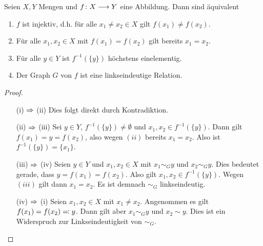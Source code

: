 \begin{bem}


  Seien $X, Y$ Mengen und $f\colon X \longrightarrow Y$ eine Abbildung. Dann sind
  äquivalent
  \begin{enumerate}

    \item $f$ ist injektiv, d.h. für alle $x_{1}\neq x_{2} \in X$ gilt
      $f(x_{1})\neq f(x_{2})$.

    \item Für alle $x_{1},x_{2}\in X$ mit $f(x_{1})=f(x_{2})$ gilt
      bereits $x_{1}=x_{2}$.

    \item Für alle $y\in Y$ ist $f^{-1}(\{ y \})$ höchstens
      einelementig.

    \item Der Graph $G$ von $f$ ist eine linkseindeutige Relation.

  \end{enumerate}

  \begin{proof}
    \quad

    \begin{itemize}
    \item[\tiny{(i) $\Rightarrow$ (ii)}] 
      Dies folgt direkt durch Kontradiktion.

    \item[\tiny{(ii) $\Rightarrow$ (iii)}] Sei $y\in Y$, $f^{-1}(\{ y \}) \neq
      \emptyset$ und $x_{1},x_{2}\in f^{-1}(\{ y \})$. Dann gilt $f(x_{1})
      = y = f(x_{2})$, also wegen $(ii)$ bereits $x_{1}=x_{2}$. Also ist
      $f^{-1}(\{ y \}) = \{ x_{1} \}$.

    \item[\tiny{(iii) $\Rightarrow$ (iv)}] Seien $y\in Y$ und $x_{1},x_{2}\in X$
      mit $x_{1}\sim_{G}y$ und $x_{2}\sim_{G}y$. Dies bedeutet gerade, dass
      $y = f(x_{1}) = f(x_{2})$. Also gilt $x_{1},x_{2}\in f^{-1}(\{
      y\})$. Wegen $(iii)$ gilt dann $x_{1}=x_{2}$. Es ist demnach
      $\sim_{G}$ linkseindeutig.

    \item[\tiny{(iv) $\Rightarrow$ (i)}] Seien $x_{1}, x_{2} \in X$ mit $x_{1}\neq
      x_{2}$. Angenommen es gilt $f(x_{1}) = f(x_{2}) \eqqcolon y$. Dann gilt
      aber $x_{1}\sim_{G}y$ und $x_{2}\sim y$. Dies ist ein Widerspruch zur
      Linkseindeutigkeit von $\sim_{G}$.

    \end{itemize}

  \end{proof}

\end{bem}

